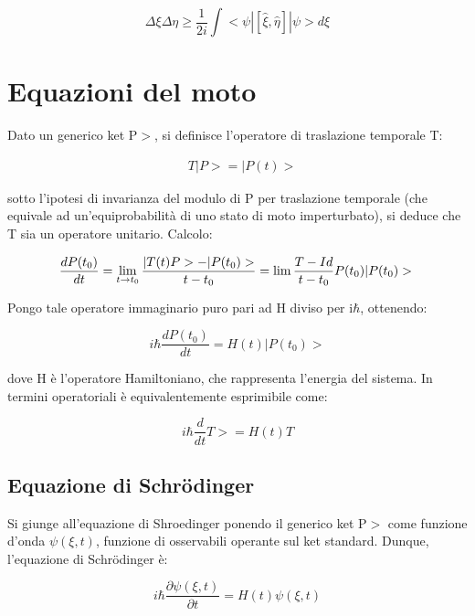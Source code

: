 \documentclass{article}
\begin{document}
\begin{equation}
    \Delta \xi \Delta \eta \geq \frac{1}{2i}\int <\psi|[\hat{\xi},\hat{\eta}]|\psi>d\xi
\end{equation}


\section{Equazioni del moto}
Dato un generico ket P$>$, si definisce l'operatore di traslazione temporale T:

\begin{equation}
    \begin{aligned}
    & T |P>= |P(t)>
    \end{aligned}
\end{equation}

sotto l'ipotesi di invarianza del modulo di P per traslazione temporale (che equivale ad un'equiprobabilità di uno stato di moto imperturbato),
si deduce che T sia un operatore unitario.
Calcolo:

\begin{equation}
     \frac{dP(t_0)}{dt}=\lim_{ t \rightarrow t_0} \frac{|T(t)P>-|P(t_0)>}{t-t_0}= \lim{\frac{T-Id}{t-t_0}P(t_0)}|P(t_0)> \\
\end{equation}

Pongo tale operatore immaginario puro pari ad H diviso per i$\hbar$, ottenendo:

\begin{equation}
   i\hbar \frac{dP(t_0)}{dt}=H(t)|P(t_0)>
\end{equation}

dove H è l'operatore Hamiltoniano, che rappresenta l'energia del sistema.
In termini operatoriali è equivalentemente esprimibile come:

\begin{equation}
    i\hbar \frac{d}{dt}T>=H(t)T
\end{equation}

\subsection{Equazione di Schrödinger}
Si giunge all'equazione di Shroedinger ponendo il generico ket P$>$ come funzione d'onda $\psi(\xi, t)$, funzione di osservabili operante sul ket standard.
Dunque, l'equazione di Schrödinger è:

\begin{equation}
    i\hbar \frac{\partial \psi(\xi, t)}{\partial t} = H(t) \psi(\xi,t)
\end{equation}
\end{document}
